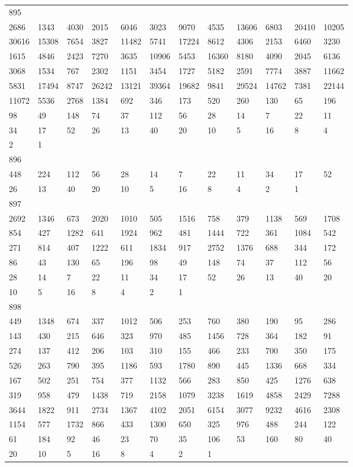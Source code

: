 \begin{longtable}{llllllllllll}
895&&&&&&&&&&&\\
2686& 1343& 4030& 2015& 6046& 3023& 9070& 4535& 13606& 6803& 20410& 10205\\
30616& 15308& 7654& 3827& 11482& 5741& 17224& 8612& 4306& 2153& 6460& 3230\\
1615& 4846& 2423& 7270& 3635& 10906& 5453& 16360& 8180& 4090& 2045& 6136\\
3068& 1534& 767& 2302& 1151& 3454& 1727& 5182& 2591& 7774& 3887& 11662\\
5831& 17494& 8747& 26242& 13121& 39364& 19682& 9841& 29524& 14762& 7381& 22144\\
11072& 5536& 2768& 1384& 692& 346& 173& 520& 260& 130& 65& 196\\
98& 49& 148& 74& 37& 112& 56& 28& 14& 7& 22& 11\\
34& 17& 52& 26& 13& 40& 20& 10& 5& 16& 8& 4\\
2& 1& \\

896&&&&&&&&&&&\\
448& 224& 112& 56& 28& 14& 7& 22& 11& 34& 17& 52\\
26& 13& 40& 20& 10& 5& 16& 8& 4& 2& 1& \\

897&&&&&&&&&&&\\
2692& 1346& 673& 2020& 1010& 505& 1516& 758& 379& 1138& 569& 1708\\
854& 427& 1282& 641& 1924& 962& 481& 1444& 722& 361& 1084& 542\\
271& 814& 407& 1222& 611& 1834& 917& 2752& 1376& 688& 344& 172\\
86& 43& 130& 65& 196& 98& 49& 148& 74& 37& 112& 56\\
28& 14& 7& 22& 11& 34& 17& 52& 26& 13& 40& 20\\
10& 5& 16& 8& 4& 2& 1& \\

898&&&&&&&&&&&\\
449& 1348& 674& 337& 1012& 506& 253& 760& 380& 190& 95& 286\\
143& 430& 215& 646& 323& 970& 485& 1456& 728& 364& 182& 91\\
274& 137& 412& 206& 103& 310& 155& 466& 233& 700& 350& 175\\
526& 263& 790& 395& 1186& 593& 1780& 890& 445& 1336& 668& 334\\
167& 502& 251& 754& 377& 1132& 566& 283& 850& 425& 1276& 638\\
319& 958& 479& 1438& 719& 2158& 1079& 3238& 1619& 4858& 2429& 7288\\
3644& 1822& 911& 2734& 1367& 4102& 2051& 6154& 3077& 9232& 4616& 2308\\
1154& 577& 1732& 866& 433& 1300& 650& 325& 976& 488& 244& 122\\
61& 184& 92& 46& 23& 70& 35& 106& 53& 160& 80& 40\\
20& 10& 5& 16& 8& 4& 2& 1& \\


\end{longtable}
